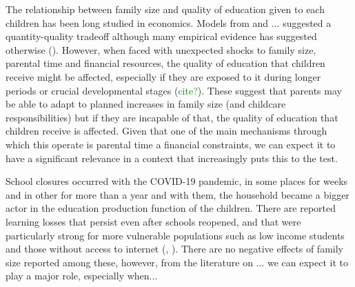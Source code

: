 





The relationship between family size and quality of education given to each children has been long studied in economics. Models from \cite{becker_child_1976} and ... suggested a quantity-quality tradeoff although many empirical evidence has suggested otherwise (\cite{black_more_2005}). However, when faced with unexpected shocks to family size, parental time and financial resources, the quality of education that children receive might be affected, especially if they are exposed to it during longer periods or crucial developmental stages (\textcolor{green}{cite?}). These suggest that parents may be able to adapt to planned increases in family size (and childcare responsibilities) but if they are incapable of that, the quality of education that children receive is affected. Given that one of the main mechanisms through which this operate is parental time a financial constraints, we can expect it to have a significant relevance in a context that increasingly puts this to the test.

School closures occurred with the COVID-19 pandemic, in some places for weeks and in other for more than a year and with them, the household became a bigger actor in the education production function of the children. There are reported learning losses that persist even after schools reopened, and that were particularly strong for more vulnerable populations such as low income students and those without access to internet (\cite{haelermans_inequality_2022}, \cite{jakubowski_global_2023}). There are no negative effects of family size reported among these, however, from the literature on ... we can expect it to play a major role, especially when...




